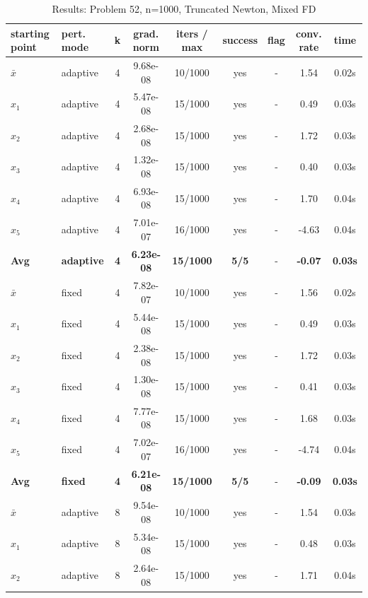 \begin{longtable}{|l|l|c|c|c|c|c|c|c|}
\caption{Results: Problem 52, n=1000, Truncated Newton, Mixed FD} \\
\hline
\textbf{starting point} & \textbf{pert. mode} & \textbf{k} & \textbf{grad. norm} & \textbf{iters / max} & \textbf{success} & \textbf{flag} & \textbf{conv. rate} & \textbf{time} \\
\hline
\endfirsthead
\endhead
\endfoot
\hline
\endlastfoot
$\bar{x}$ & adaptive & 4 & 9.68e-08 & 10/1000 & yes & - & 1.54 & 0.02s \\
\hline
$x_1$ & adaptive & 4 & 5.47e-08 & 15/1000 & yes & - & 0.49 & 0.03s \\
\hline
$x_2$ & adaptive & 4 & 2.68e-08 & 15/1000 & yes & - & 1.72 & 0.03s \\
\hline
$x_3$ & adaptive & 4 & 1.32e-08 & 15/1000 & yes & - & 0.40 & 0.03s \\
\hline
$x_4$ & adaptive & 4 & 6.93e-08 & 15/1000 & yes & - & 1.70 & 0.04s \\
\hline
$x_5$ & adaptive & 4 & 7.01e-07 & 16/1000 & yes & - & -4.63 & 0.04s \\
\hline
\hline\hline
\textbf{Avg} & \textbf{adaptive} & \textbf{4} & \textbf{6.23e-08} & \textbf{15/1000} & \textbf{5/5} & - & \textbf{-0.07} & \textbf{0.03s} \\
\hline\hline
\hline
$\bar{x}$ & fixed & 4 & 7.82e-07 & 10/1000 & yes & - & 1.56 & 0.02s \\
\hline
$x_1$ & fixed & 4 & 5.44e-08 & 15/1000 & yes & - & 0.49 & 0.03s \\
\hline
$x_2$ & fixed & 4 & 2.38e-08 & 15/1000 & yes & - & 1.72 & 0.03s \\
\hline
$x_3$ & fixed & 4 & 1.30e-08 & 15/1000 & yes & - & 0.41 & 0.03s \\
\hline
$x_4$ & fixed & 4 & 7.77e-08 & 15/1000 & yes & - & 1.68 & 0.03s \\
\hline
$x_5$ & fixed & 4 & 7.02e-07 & 16/1000 & yes & - & -4.74 & 0.04s \\
\hline
\hline\hline
\textbf{Avg} & \textbf{fixed} & \textbf{4} & \textbf{6.21e-08} & \textbf{15/1000} & \textbf{5/5} & - & \textbf{-0.09} & \textbf{0.03s} \\
\hline\hline
$\bar{x}$ & adaptive & 8 & 9.54e-08 & 10/1000 & yes & - & 1.54 & 0.03s \\
\hline
$x_1$ & adaptive & 8 & 5.34e-08 & 15/1000 & yes & - & 0.48 & 0.03s \\
\hline
$x_2$ & adaptive & 8 & 2.64e-08 & 15/1000 & yes & - & 1.71 & 0.04s \\

\end{longtable}
